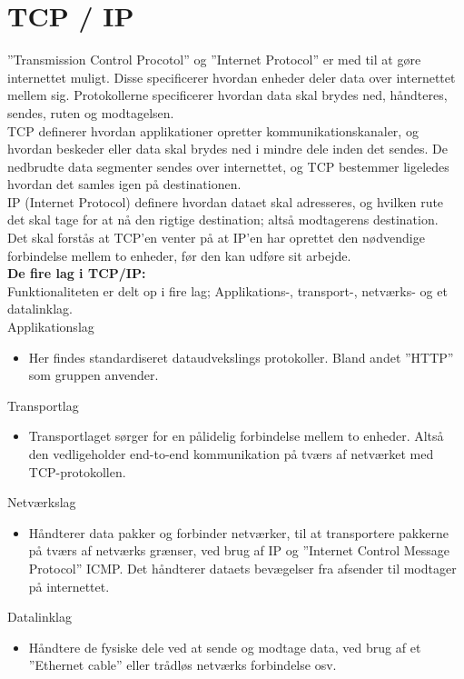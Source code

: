 \section{TCP / IP}\label{sec:tcp}
”Transmission Control Procotol” og ”Internet Protocol” \cite{TCP} er med til at gøre internettet muligt. 
Disse specificerer hvordan enheder deler data over internettet mellem sig. 
Protokollerne specificerer hvordan data skal brydes ned, håndteres, sendes, ruten og modtagelsen.\\

TCP definerer hvordan applikationer opretter kommunikationskanaler, 
og hvordan beskeder eller data skal brydes ned i mindre dele inden det sendes. 
De nedbrudte data segmenter sendes over internettet, 
og TCP bestemmer ligeledes hvordan det samles igen på destinationen. \\

IP (Internet Protocol) definere hvordan dataet skal adresseres, 
og hvilken rute det skal tage for at nå den rigtige destination; altså modtagerens destination. \\

Det skal forstås at TCP’en venter på at IP’en har oprettet den nødvendige forbindelse mellem to enheder, 
før den kan udføre sit arbejde. \\

\textbf{De fire lag i TCP/IP:} \\
Funktionaliteten er delt op i fire lag; Applikations-, transport-, netværks- og et datalinklag.\\

Applikationslag
\begin{itemize}
    \item Her findes standardiseret dataudvekslings protokoller. Bland andet ”HTTP” som gruppen anvender.\\
\end{itemize} 

Transportlag
\begin{itemize}
    \item Transportlaget sørger for en pålidelig forbindelse mellem to enheder. 
    Altså den vedligeholder end-to-end kommunikation på tværs af netværket med TCP-protokollen.\\
\end{itemize}

Netværkslag
\begin{itemize}
    \item Håndterer data pakker og forbinder netværker, 
    til at transportere pakkerne på tværs af netværks grænser, 
    ved brug af IP og ”Internet Control Message Protocol” ICMP. 
    Det håndterer dataets bevægelser fra afsender til modtager på internettet.\\
\end{itemize}

Datalinklag
\begin{itemize}
    \item Håndtere de fysiske dele ved at sende og modtage data, 
    ved brug af et ”Ethernet cable” eller trådløs netværks forbindelse osv.\\
\end{itemize}

